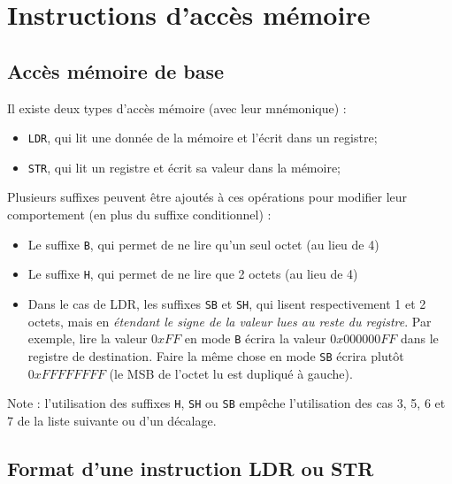 \documentclass{tufte-handout}
\begin{document}
\clearpage
\section{Instructions d'accès mémoire}
\vspace{-0.8em}
\subsection{Accès mémoire de base}

Il existe deux types d'accès mémoire (avec leur mnémonique) :
\begin{itemize}
	\item \texttt{LDR}, qui lit une donnée de la mémoire et l'écrit dans un registre;
	\item \texttt{STR}, qui lit un registre et écrit sa valeur dans la mémoire;
\end{itemize}

Plusieurs suffixes peuvent être ajoutés à ces opérations pour modifier leur comportement (en plus du suffixe conditionnel) :
\begin{itemize}
	\item Le suffixe \texttt{B}, qui permet de ne lire qu'un seul octet (au lieu de 4)
	\item Le suffixe \texttt{H}, qui permet de ne lire que 2 octets (au lieu de 4)
	\item Dans le cas de LDR, les suffixes \texttt{SB} et \texttt{SH}, qui lisent respectivement 1 et 2 octets, mais en \textit{étendant le signe de la valeur lues au reste du registre}. Par exemple, lire la valeur $0xFF$ en mode \texttt{B} écrira la valeur $0x000000FF$ dans le registre de destination. Faire la même chose en mode \texttt{SB} écrira plutôt $0xFFFFFFFF$ (le MSB de l'octet lu est dupliqué à gauche).
\end{itemize}
Note : l'utilisation des suffixes \texttt{H}, \texttt{SH} ou \texttt{SB} empêche l'utilisation des cas 3, 5, 6 et 7 de la liste suivante ou d'un décalage.

\subsection{Format d'une instruction LDR ou STR}
\end{document}
